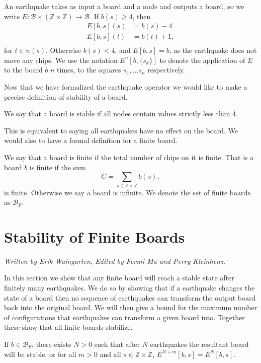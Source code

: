 \documentclass[runningheads,a4paper]{llncs}
\begin{document}
\begin{definition}
An earthquake takes as input a board and a node and outputs a board, so we write $E: \mathcal{B} \times (\mathbb{Z} \times \mathbb{Z}) \rightarrow \mathcal{B}$. If $b(s) \geq 4$, then
\begin{align*}
E[b, s](s) &= b(s)-4 \\
E[b, s](t) &= b(t)+1, \\
\end{align*}
for $ t \in n(s)$. Otherwise  $b(s) < 4$, and $E[b, s] = b$, as the earthquake does not move any chips.
We use the notation $E^n[b, \{s_k\}]$ to denote the application of $E$ to the board $b$ $n$ times, to the squares $s_1, \ldots s_{n}$ respectively. 
\end{definition}

Now that we have formalized the earthquake operator we would like to make a precise definition of stability of a board.
\begin{definition}
We say that a board is stable if all nodes contain values strictly less than 4. 
\end{definition}
This is equivalent to saying all earthquakes have no effect on the board. We would also to have a formal definition for a finite board. 

\begin{definition} 
We say that a board is finite if the total number of chips on it is finite. That is a board $b$ is finite if the sum
\begin{equation}
C= \sum_{s \in \mathbb{Z} \times \mathbb{Z}} b(s), 
\end{equation}
is finite. Otherwise we say a board is infinite. 
We denote the set of finite boards as $\mathcal{B}_F$.
\end{definition}

\section{Stability of Finite Boards}
\label{Stability of Finite Boards}
\emph{Written by Erik Waingarten, Edited by Fermi Ma and Perry Kleinhenz.}

In this section we show that any finite board will reach a stable state after finitely many earthquakes.
We do so by showing that if a earthquake changes the state of a board then no sequence of earthquakes can transform the output board back into the original board. 
We will then give a bound for the maximum number of configurations that earthquakes can transform a given board into. 
Together these show that all finite boards stabilize. 
\begin{theorem}
\label{finitestability}
If $b \in \mathcal{B}_F$, there exists $N> 0$ such that after $N$ earthquakes the resultant board will be stable, or for all $m > 0$ and all $s \in \mathbb{Z} \times \mathbb{Z}$, $E^{N+m}[b,s] = E^N[b,s]$.
\end{theorem}
\end{document}
